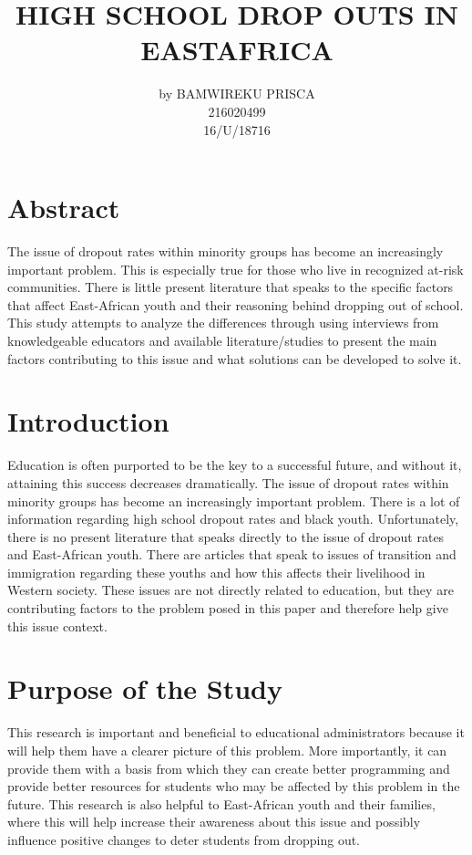 \documentclass[10pt,letterpaper]{article}
\begin{document}
\title{HIGH SCHOOL DROP OUTS IN EASTAFRICA}
\author{by BAMWIREKU PRISCA   \\ 216020499 \\  16/U/18716}
\maketitle
\section {Abstract }
The issue of dropout rates within minority groups has become an increasingly important problem. This is especially true for those who live in recognized at-risk communities. There is little present literature that speaks to the specific factors that affect East-African youth and their reasoning behind dropping out of school. This study attempts to analyze the differences through using interviews from knowledgeable educators and available literature/studies to present the main factors contributing to this issue and what solutions can be developed to solve it.
\section{Introduction }
Education is often purported to be the key to a successful future, and without it, attaining this success decreases dramatically. The issue of dropout rates within minority groups has become an increasingly important problem. 
 There is a lot of information regarding high school dropout rates and black youth. Unfortunately, there is no present literature that speaks directly to the issue of dropout rates and East-African youth. There are articles that speak to issues of transition and immigration regarding these youths and how this affects their livelihood in Western society. These issues are not directly related to education, but they are contributing factors to the problem posed in this paper and therefore help give this issue context. 

\section{Purpose of the Study }
This research is important and beneficial to educational administrators because it will help them have a clearer picture of this problem. More importantly, it can provide them with a basis from which they can create better programming and provide better resources for students who may be affected by this problem in the future. This research is also helpful to East-African youth and their families, where this will help increase their awareness about this issue and possibly influence positive changes to deter students from dropping out.
\end{document}
